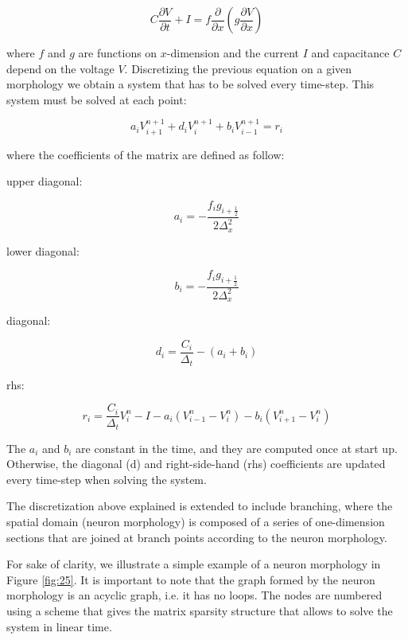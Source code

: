 \begin{equation}
    C \frac{\partial V}{\partial t}+I=f \frac{\partial}{\partial x}\left(g \frac{\partial V}{\partial x}\right)
\end{equation}

where $f$ and $g$ are functions on $x$-dimension and the current $I$ and 
capacitance $C$ depend on the voltage $V$. Discretizing the previous 
equation on a given morphology we obtain a system that has to be solved 
every time-step. This system must be solved at each point:

\begin{equation}
    a_{i} V_{i+1}^{n+1}+d_{i} V_{i}^{n+1}+b_{i} V_{i-1}^{n+1}=r_{i}
\end{equation}

where the coefficients of the matrix are defined as follow:

upper diagonal: 

\begin{equation}
    a_{i}=-\frac{f_{i} g_{i+\frac{1}{2}}}{2 \Delta_{x}^{2}}
\end{equation}

lower diagonal: 

\begin{equation}
    b_{i}=-\frac{f_{i} g_{i+\frac{1}{2}}}{2 \Delta_{x}^{2}}
\end{equation}

diagonal: 

\begin{equation}
    d_{i}=\frac{C_{i}}{\Delta_{t}}-\left(a_{i}+b_{i}\right)
\end{equation}

rhs: 

\begin{equation}
    r_{i}=\frac{C_{i}}{\Delta_{t}} V_{i}^{n}-I-a_{i}\left(V_{i-1}^{n}-V_{i}^{n}\right)-b_{i}\left(V_{i+1}^{n}-V_{i}^{n}\right)
\end{equation}

The $a_i$ and $b_i$ are constant in the time, and they are computed once at start up.
Otherwise, the diagonal (d) and right-side-hand (rhs) coefficients are updated every
time-step when solving the system.

The discretization above explained is extended to include branching, where the
spatial domain (neuron morphology) is composed of a series of one-dimension sections
that are joined at branch points according to the neuron morphology.

For sake of clarity, we illustrate a simple example of a neuron morphology in Figure \ref{fig:25}. It is important to note that the graph formed by the neuron morphology is an
acyclic graph, i.e. it has no loops. The nodes are numbered using a scheme that gives
the matrix sparsity structure that allows to solve the system in linear time.

